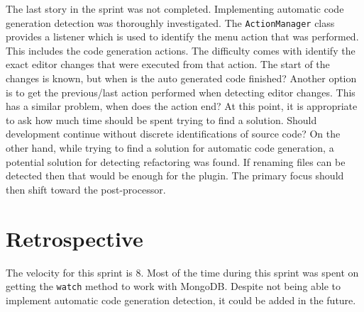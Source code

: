 The last story in the sprint was not completed. Implementing automatic code generation detection was thoroughly investigated. The \texttt{ActionManager} class provides a listener which is used to identify the menu action that was performed. This includes the code generation actions. The difficulty comes with identify the exact editor changes that were executed from that action. The start of the changes is known, but when is the auto generated code finished? Another option is to get the previous/last action performed when detecting editor changes. This has a similar problem, when does the action end? At this point, it is appropriate to ask how much time should be spent trying to find a solution. Should development continue without discrete identifications of source code? On the other hand, while trying to find a solution for automatic code generation, a potential solution for detecting refactoring was found. If renaming files can be detected then that would be enough for the plugin. The primary focus should then shift toward the post-processor.

\section{Retrospective}
The velocity for this sprint is 8. Most of the time during this sprint was spent on getting the \texttt{watch} method to work with MongoDB. Despite not being able to implement automatic code generation detection, it could be added in the future.
